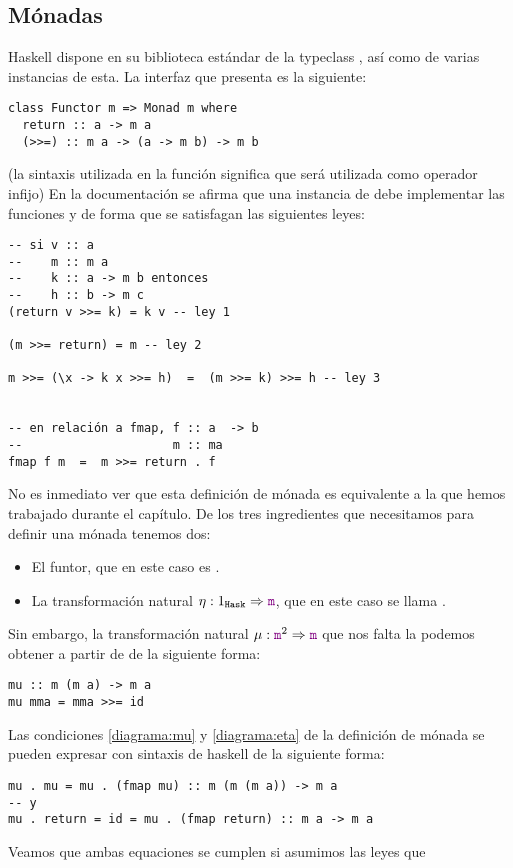 \subsection{Mónadas}
Haskell dispone en su biblioteca estándar de la typeclass ,
así como de varias instancias de esta. La interfaz que presenta
es la siguiente:
\begin{verbatim}
class Functor m => Monad m where
  return :: a -> m a
  (>>=) :: m a -> (a -> m b) -> m b
\end{verbatim}
(la sintaxis utilizada en la función \cod{>{}>=}
significa que será utilizada como operador infijo)
En la documentación se afirma que una instancia de 
debe implementar las funciones  y
\cod{>{}>=} de forma que se satisfagan las siguientes leyes:
\begin{verbatim}
-- si v :: a
--    m :: m a
--    k :: a -> m b entonces
--    h :: b -> m c
(return v >>= k) = k v -- ley 1

(m >>= return) = m -- ley 2

m >>= (\x -> k x >>= h)  =  (m >>= k) >>= h -- ley 3


-- en relación a fmap, f :: a  -> b
--                     m :: ma
fmap f m  =  m >>= return . f
\end{verbatim}
No es inmediato ver que esta definición de mónada es equivalente
a la que hemos trabajado durante el capítulo. De los tres
ingredientes que necesitamos para definir una mónada tenemos dos:
\begin{itemize}
\item El funtor, que en este caso es .
\item La transformación natural $\eta : 1_{\texttt{Hask}}\Rightarrow \textcolor{violet}{\texttt{m}}$, que
  en este caso se llama .
\end{itemize}
Sin embargo, la transformación natural
$\mu : \textcolor{violet}{\texttt{m}}^2\Rightarrow \textcolor{violet}{\texttt{m}}$ que nos falta la podemos obtener
a partir de  de la siguiente forma:
\begin{verbatim}
mu :: m (m a) -> m a
mu mma = mma >>= id
\end{verbatim}
Las condiciones \eqref{diagrama:mu} y \eqref{diagrama:eta}
de la definición de mónada
se pueden expresar con sintaxis de haskell de la siguiente forma:
\begin{verbatim}
mu . mu = mu . (fmap mu) :: m (m (m a)) -> m a
-- y
mu . return = id = mu . (fmap return) :: m a -> m a
\end{verbatim}
Veamos que ambas equaciones se cumplen si asumimos las leyes que
